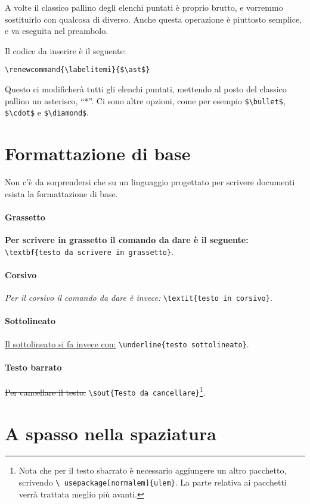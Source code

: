 A volte il classico pallino degli elenchi puntati è proprio brutto, e vorremmo
sostituirlo con qualcosa di diverso.
Anche questa operazione è piuttosto semplice, e va eseguita nel preambolo.

\noindent Il codice da inserire è il seguente:

\verb!\renewcommand{\labelitemi}{$\ast$}!

\noindent Questo ci modificherà tutti gli elenchi puntati, mettendo al posto
del classico pallino un asterisco, ``*''. Ci sono altre opzioni, come per
esempio \verb!$\bullet$!, \verb!$\cdot$! e \verb!$\diamond$!.

\section{Formattazione di base}

Non c'è da sorprendersi che su un linguaggio progettato per scrivere documenti
esista la formattazione di base.

\paragraph*{Grassetto} \textbf{Per scrivere in grassetto il comando da dare è
il seguente: }\verb!\textbf{testo da scrivere in grassetto}!.

\paragraph*{Corsivo} \textit{Per il corsivo il comando da dare è invece: }
\verb!\textit{testo in corsivo}!.

\paragraph*{Sottolineato} \underline{Il sottolineato si fa invece con:}
\verb!\underline{testo sottolineato}!.

\paragraph*{Testo barrato} \sout{Per cancellare il testo: }
\verb!\sout{Testo da cancellare}!\footnote{Nota che per il testo sbarrato è
necessario aggiungere un altro pacchetto, scrivendo \texttt{\textbackslash
usepackage[normalem]\{ulem\}}. La parte relativa ai pacchetti verrà trattata
meglio più avanti.}.

\section{A spasso nella spaziatura}

